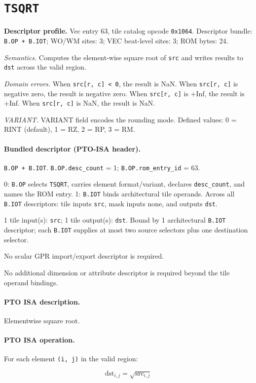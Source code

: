 \section{\texttt{TSQRT}}
\noindent\textbf{Descriptor profile.} Vec entry 63, tile catalog opcode \texttt{0x1064}. Descriptor bundle: \texttt{B.OP + B.IOT}; WO/WM sites: 3; VEC beat-level sites: 3; ROM bytes: 24.

\textit{Semantics.} Computes the element-wise square root of \texttt{src} and writes results to \texttt{dst} across the valid region.

\textit{Domain errors.} When \texttt{src[r, c] < 0}, the result is NaN. When \texttt{src[r, c]} is negative zero, the result is negative zero. When \texttt{src[r, c]} is +Inf, the result is +Inf. When \texttt{src[r, c]} is NaN, the result is NaN.

\textit{VARIANT.} VARIANT field encodes the rounding mode. Defined values: 0 = RINT (default), 1 = RZ, 2 = RP, 3 = RM.\par\smallskip
{}
\paragraph{Bundled descriptor (PTO-ISA header).}
\begin{description}[leftmargin=0.18\linewidth,style=nextline]
\item[Bundle] \texttt{B.OP + B.IOT}. \texttt{B.OP.desc\_count} = 1; \texttt{B.OP.rom\_entry\_id} = 63.
\item[Assembly] 0: \texttt{B.OP} selects \texttt{TSQRT}, carries element format/variant, declares \texttt{desc\_count}, and names the ROM entry. 1: \texttt{B.IOT} binds architectural tile operands. Across all \texttt{B.IOT} descriptors: tile inputs \texttt{src}, mask inputs none, and outputs \texttt{dst}.
\item[Tile operands] 1 tile input(s): \texttt{src}; 1 tile output(s): \texttt{dst}. Bound by 1 architectural \texttt{B.IOT} descriptor; each \texttt{B.IOT} supplies at most two source selectors plus one destination selector.
\item[Scalar GPR operands] No scalar GPR import/export descriptor is required.
\item[Metadata operands] No additional dimension or attribute descriptor is required beyond the tile operand bindings.
\end{description}
\par\smallskip
{\small
\paragraph{PTO ISA description.}
Elementwise square root.
\paragraph{PTO ISA operation.}
For each element \texttt{(i, j)} in the valid region:

\[
\mathrm{dst}_{i,j} = \sqrt{\mathrm{src}_{i,j}}
\]
}\par\smallskip
